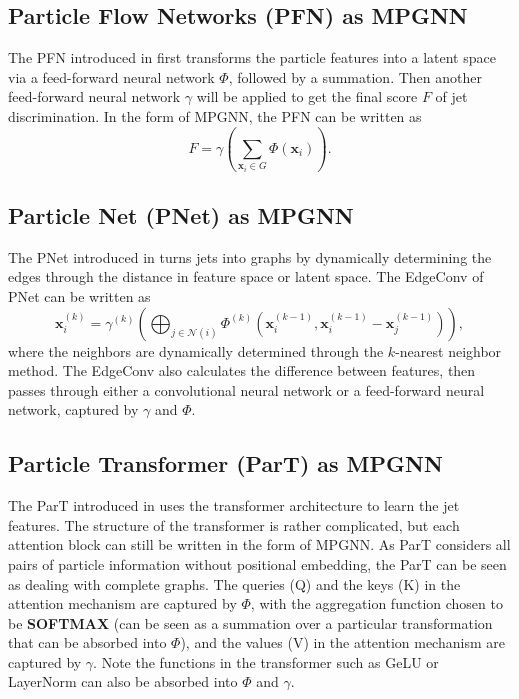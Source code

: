 \documentclass[reprint,amsmath,amssymb,prd,nofootinbib]{revtex4-2}
\def\xbf{\mathbf{x}}
\begin{document}
\subsection{Particle Flow Networks (PFN) as MPGNN}
The PFN introduced in \cite{pfn} first transforms the particle features into a latent space via a feed-forward neural network $\Phi$, followed by a summation. Then another feed-forward neural network $\gamma$ will be applied to get the final score $F$ of jet discrimination. In the form of MPGNN, the PFN can be written as
\begin{equation*}
    F=\gamma\left(\sum_{\xbf_i \in G}\Phi(\xbf_i)\right).
\end{equation*}

\subsection{Particle Net (PNet) as MPGNN}
The PNet introduced in \cite{ptcnet} turns jets into graphs by dynamically determining the edges through the distance in feature space or latent space. The EdgeConv of PNet can be written as
\begin{equation*}
    \xbf^{(k)}_i=\gamma^{(k)}\left(\bigoplus_{j \in \mathcal{N}(i)}\Phi^{(k)}(\xbf^{(k-1)}_i,\xbf^{(k-1)}_i-\xbf^{(k-1)}_j)\right),
\end{equation*}
where the neighbors are dynamically determined through the $k$-nearest neighbor method. The EdgeConv also calculates the difference between features, then passes through either a convolutional neural network or a feed-forward neural network, captured by $\gamma$ and $\Phi$.

\subsection{Particle Transformer (ParT) as MPGNN}
The ParT introduced in \cite{part} uses the transformer architecture to learn the jet features. The structure of the transformer is rather complicated, but each attention block can still be written in the form of MPGNN. As ParT considers all pairs of particle information without positional embedding, the ParT can be seen as dealing with complete graphs. The queries (Q) and the keys (K) in the attention mechanism are captured by $\Phi$, with the aggregation function chosen to be \textbf{SOFTMAX} (can be seen as a summation over a particular transformation that can be absorbed into $\Phi$), and the values (V) in the attention mechanism are captured by $\gamma$. Note the functions in the transformer such as GeLU or LayerNorm can also be absorbed into $\Phi$ and $\gamma$.
\end{document}
